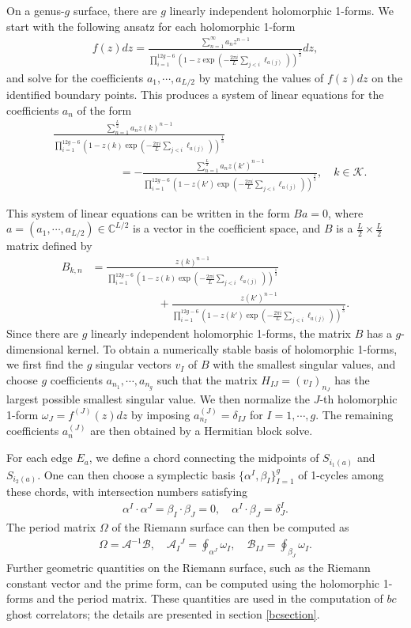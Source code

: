 \documentclass[12pt]{article}
\def\ie{\begin{equation}\begin{aligned}}
\def\fe{\end{aligned}\end{equation}}
\numberwithin{equation}{section}
\begin{document}
On a genus-$g$ surface, there are $g$ linearly independent holomorphic 1-forms. We start with the following ansatz for each holomorphic 1-form
\ie \label{fzdz}
f(z)dz= \frac{\sum_{n=1}^\infty a_n z^{n-1}}{\prod_{i=1}^{12g-6}\left(1-z\exp\left({-\frac{2\pi i}{L}\sum_{j<i}\ell_{a(j)}}\right)\right)^{\frac{1}{3}}}dz,
\fe
and solve for the coefficients $a_1,\cdots, a_{L/2}$ by matching the values of $f(z)dz$ on the identified boundary points. This produces a system of linear equations for the coefficients $a_n$ of the form
\ie
&\frac{\sum_{n=1}^{\frac{L}{2}} a_n z(k)^{n-1}}{\prod_{i=1}^{12g-6}\left(1-z(k)\exp\left({-\frac{2\pi i}{L}\sum_{j<i}\ell_{a(j)}}\right)\right)^{\frac{1}{3}}}\\&\qquad \qquad \qquad = - \frac{\sum_{n=1}^{\frac{L}{2}} a_n z(k')^{n-1}}{\prod_{i=1}^{12g-6}\left(1-z(k')\exp\left({-\frac{2\pi i}{L}\sum_{j<i}\ell_{a(j)}}\right)\right)^{\frac{1}{3}}},\quad k \in \mathcal{K}.
\fe

This system of linear equations can be written in the form $Ba=0$, where $a=(a_1,\cdots, a_{L/2})\in \mathbb{C}^{L/2}$ is a vector in the coefficient space, and $B$ is a $\tfrac{L}{2}\times \tfrac{L}{2}$ matrix defined by
\ie
B_{k,n} &= \frac{z(k)^{n-1}}{\prod_{i=1}^{12g-6}\left(1-z(k)\exp\left({-\frac{2\pi i}{L}\sum_{j<i}\ell_{a(j)}}\right)\right)^{\frac{1}{3}}}\\
&\qquad \qquad \qquad + \frac{z(k')^{n-1}}{\prod_{i=1}^{12g-6}\left(1-z(k')\exp\left({-\frac{2\pi i}{L}\sum_{j<i}\ell_{a(j)}}\right)\right)^{\frac{1}{3}}}.
\fe
Since there are $g$ linearly independent holomorphic 1-forms, the matrix $B$ has a $g$-dimensional kernel. To obtain a numerically stable basis of holomorphic 1-forms, we first find the $g$ singular vectors $v_I$ of $B$ with the smallest singular values, and choose $g$ coefficients $a_{n_1},\cdots, a_{n_g}$ such that the matrix $H_{IJ}=(v_I)_{n_J}$ has the largest possible smallest singular value. We then normalize the $J$-th holomorphic 1-form $\omega_J=f^{(J)}(z)dz$ by imposing $a^{(J)}_{n_I} = \delta_{IJ}$ for $I=1,\cdots,g$. The remaining coefficients $a^{(J)}_n$ are then obtained by a Hermitian block solve.

For each edge $E_a$, we define a chord connecting the midpoints of $S_{i_1(a)}$ and $S_{i_2(a)}$. One can then choose a symplectic basis $\{\alpha^I, \beta_I\}_{I=1}^g$ of 1-cycles among these chords, with intersection numbers satisfying
\ie
\alpha^I\cdot \alpha^J = \beta_I\cdot \beta_J = 0,\quad \alpha^I\cdot \beta_J= \delta^{I}_J.
\fe
The period matrix $\Omega$ of the Riemann surface can then be computed as
\ie \label{periodmatrix}
\Omega=\mathcal{A}^{-1}\mathcal{B},\quad \mathcal{A}_{I}{}^J=\oint_{\alpha^J}\omega_I,\quad \mathcal{B}_{IJ}=\oint_{\beta_J} \omega_I.
\fe
Further geometric quantities on the Riemann surface, such as the Riemann constant vector and the prime form, can be computed using the holomorphic 1-forms and the period matrix. These quantities are used in the computation of $bc$ ghost correlators; the details are presented in section \ref{bcsection}.
\end{document}
